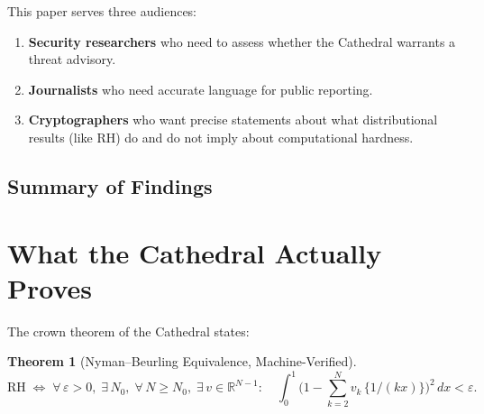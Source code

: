 \documentclass[11pt,a4paper]{article}
\theoremstyle{definition}
\newtheorem{theorem}{Theorem}[section]
\theoremstyle{plain}
\newcommand{\RH}{\ensuremath{\mathrm{RH}}}
\newcommand{\RR}{\mathbb{R}}
\newcommand{\fract}[1]{\{#1\}}
\begin{document}
This paper serves three audiences:

\begin{enumerate}
  \item \textbf{Security researchers} who need to assess whether the
    Cathedral warrants a threat advisory.
  \item \textbf{Journalists} who need accurate language for public
    reporting.
  \item \textbf{Cryptographers} who want precise statements about
    what distributional results (like RH) do and do not imply about
    computational hardness.
\end{enumerate}

\subsection{Summary of Findings}

\begin{center}
\end{center}

\section{What the Cathedral Actually Proves}
\label{sec:what}

The crown theorem of the Cathedral states:
\begin{theorem}[Nyman--Beurling Equivalence, Machine-Verified]
\[
  \RH \;\iff\;
  \forall\,\varepsilon > 0,\;\exists\,N_0,\;\forall\,N \geq N_0,\;
  \exists\,v \in \RR^{N-1} :\quad
  \int_0^1 \biggl(1 - \sum_{k=2}^{N} v_k\,\fract{1/(kx)}\biggr)^2\,dx < \varepsilon.
\]
\end{theorem}
\end{document}
